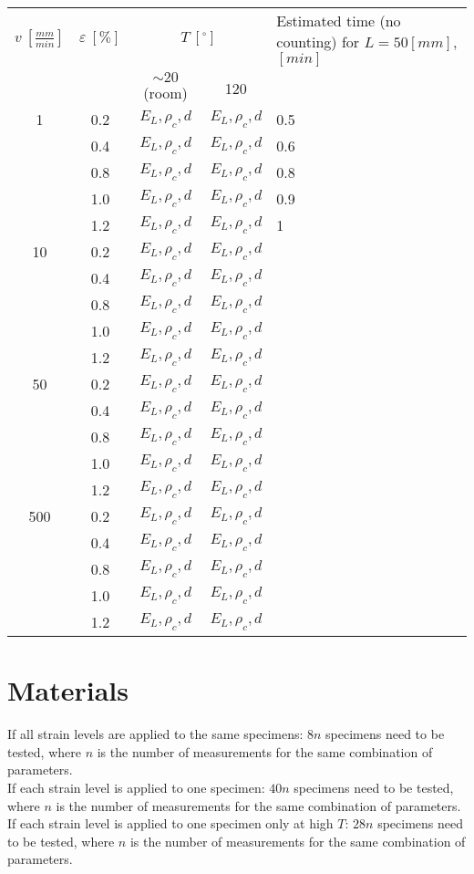 \documentclass[review]{elsarticle}
\begin{document}
\begin{table}[!h]
\centering
\begin{tabularx}{\textwidth}{ccccX}
$v\ \left[\frac{mm}{min}\right]$&$\varepsilon\ \left[\%\right]$&\multicolumn{2}{c}{$T\ \left[^{\circ}\right]$}&Estimated time (no counting) for $L=50 \left[mm\right]$, $\left[min\right]$\\
&&$\sim 20$ (room)&120&\\
\toprule
\midrule
1&0.2&$E_{L},\rho_{c},d$&$E_{L},\rho_{c},d$&0.5\\
&0.4&$E_{L},\rho_{c},d$&$E_{L},\rho_{c},d$&0.6\\
&0.8&$E_{L},\rho_{c},d$&$E_{L},\rho_{c},d$&0.8\\
&1.0&$E_{L},\rho_{c},d$&$E_{L},\rho_{c},d$&0.9\\
&1.2&$E_{L},\rho_{c},d$&$E_{L},\rho_{c},d$&1\\
\midrule
10&0.2&$E_{L},\rho_{c},d$&$E_{L},\rho_{c},d$&\\
&0.4&$E_{L},\rho_{c},d$&$E_{L},\rho_{c},d$&\\
&0.8&$E_{L},\rho_{c},d$&$E_{L},\rho_{c},d$&\\
&1.0&$E_{L},\rho_{c},d$&$E_{L},\rho_{c},d$&\\
&1.2&$E_{L},\rho_{c},d$&$E_{L},\rho_{c},d$&\\
\midrule
50&0.2&$E_{L},\rho_{c},d$&$E_{L},\rho_{c},d$&\\
&0.4&$E_{L},\rho_{c},d$&$E_{L},\rho_{c},d$&\\
&0.8&$E_{L},\rho_{c},d$&$E_{L},\rho_{c},d$&\\
&1.0&$E_{L},\rho_{c},d$&$E_{L},\rho_{c},d$&\\
&1.2&$E_{L},\rho_{c},d$&$E_{L},\rho_{c},d$&\\
\midrule
500&0.2&$E_{L},\rho_{c},d$&$E_{L},\rho_{c},d$&\\
&0.4&$E_{L},\rho_{c},d$&$E_{L},\rho_{c},d$&\\
&0.8&$E_{L},\rho_{c},d$&$E_{L},\rho_{c},d$&\\
&1.0&$E_{L},\rho_{c},d$&$E_{L},\rho_{c},d$&\\
&1.2&$E_{L},\rho_{c},d$&$E_{L},\rho_{c},d$&\\
\end{tabularx}
\end{table}

\section{Materials}

If all strain levels are applied to the same specimens: $8n$ specimens need to be tested, where $n$ is the number of measurements for the same combination of parameters.\\
If each strain level is applied to one specimen: $40n$ specimens need to be tested, where $n$ is the number of measurements for the same combination of parameters.\\ 
If each strain level is applied to one specimen only at high $T$: $28n$ specimens need to be tested, where $n$ is the number of measurements for the same combination of parameters.\\ 
\end{document}
